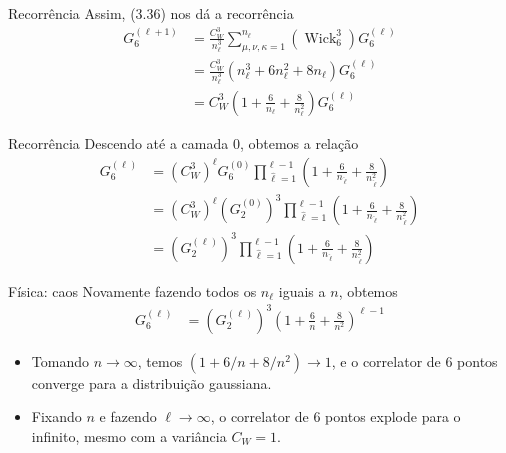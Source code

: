\documentclass{beamer}
\DeclareMathOperator{\Wick}{Wick}
\def\mi#1{{\,\widehat{#1}}}
\def\eell{{(\ell)}}
\def\eellum{{(\ell+1)}}
\begin{document}
\begin{frame}{Recorrência}
	Assim, (3.36) nos dá a recorrência
	\begin{align*}\tag{3.42}
		G_6^\eellum &=  \frac{C_W^3}{n_\ell^3} \sum_{\mu,\nu,\kappa=1}^{n_\ell} \left(\Wick_6^3 \right) G_6^\eell \\
		&= \frac{C_W^3}{n_\ell^3}\left(n_\ell^3 + 6n_\ell^2 + 8n_\ell\right)G_6^{(\ell)} \\  
		&= C_W^3\left(1 + \frac{6}{n_\ell} + \frac{8}{n_\ell^2}\right)G_6^{(\ell)}
	\end{align*}
\end{frame}

\begin{frame}{Recorrência}
	Descendo até a camada 0, obtemos a relação
	\begin{align*}\tag{3.43}
		G_6^\eell &= \left(C_W^3\right)^{\ell}G_6^{(0)}\prod_{\mi{\ell}=1}^{\ell-1}\left(1 + \frac{6}{n_{\mi\ell}} + \frac{8}{n_{\mi\ell}^2}\right) \\
		& = \left(C_W^3\right)^{\ell}\left(G_2^{(0)}\right)^3\prod_{\mi{\ell}=1}^{\ell-1}\left(1 + \frac{6}{n_{\mi\ell}} + \frac{8}{n_{\mi\ell}^2}\right)\\
		& =  \left(G_2^\eell\right)^3\prod_{\mi{\ell}=1}^{\ell-1}\left(1 + \frac{6}{n_{\mi\ell}} + \frac{8}{n_{\mi\ell}^2}\right)
	\end{align*}
\end{frame}

\begin{frame}{Física: caos}
	Novamente fazendo todos os $n_\ell$ iguais a $n$, obtemos
	\begin{align*}\tag{3.43'}
		G_6^\eell &= \left(G_2^\eell\right)^3\left(1 + \frac{6}{n} + \frac{8}{n^2}\right)^{\ell-1} 
	\end{align*}

	\begin{itemize}
		\item Tomando $n\to\infty$, temos $(1 + 6/n + 8/n^2) \to 1$, e o correlator de 6 pontos converge para a distribuição gaussiana.
		\item Fixando $n$ e fazendo $\ell\to\infty$, o correlator de 6 pontos explode para o infinito, mesmo com a variância $C_W = 1$. 
	\end{itemize}
\end{frame}
\end{document}
